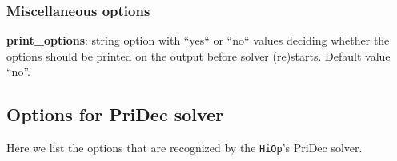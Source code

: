 \documentclass[11pt]{article}
\newcommand{\Hi}{\texttt{HiOp}\xspace}
\begin{document}
\medskip

\subsubsection{Miscellaneous options}

\noindent \textbf{print\_options}: string option with ``yes`` or ``no`` values deciding whether the options should be printed on the output before solver (re)starts. Default value ``no''.


\subsection{Options for PriDec solver}

Here we list the options that are recognized by the \Hi's PriDec solver.










\end{document}
